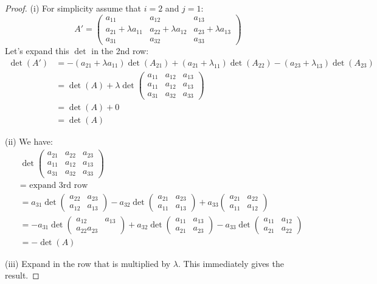 \documentclass[10pt]{scrartcl}
\begin{document}
\begin{proof}
(i) For simplicity assume that $i = 2$ and $j =1$: 
\[
  A' = \begin{pmatrix}
 a_{11} & a_{12} & a_{13}\\
 a_{21} + \lambda a_{11} & a_{22} + \lambda a_{12} & a_{23} + \lambda a_{13}\\
 a_{31} & a_{32} & a_{33} 	
 \end{pmatrix}
\]
Let's expand this $\det$ in the 2nd row: 
\begin{align*}
  \det(A') &= -(a_{21} + \lambda a_{11})\det(A_{21}) + (a_{21} + \lambda_{11})\det(A_{22}) - (a_{23} + \lambda_{13})\det(A_{23})\\
  &= \det(A) + \lambda\det\begin{pmatrix}
 a_{11} & a_{12} & a_{13}\\
 a_{11} & a_{12} & a_{13}\\
 a_{31} & a_{32} & a_{33}	
 \end{pmatrix}\\
 &= \det(A) + 0 \\
 &= \det(A)
\end{align*}

(ii) We have:
\begin{align*}
  &\det\begin{pmatrix}
 a_{21} & a_{22} & a_{23}\\
 a_{11} & a_{12} & a_{13}\\
 a_{31} & a_{32} & a_{33}	
 \end{pmatrix}\\
 &= \text{ expand 3rd row }\\
 &= a_{31}\det\begin{pmatrix}
a_{22} &a_{23}\\ a_{12} & a_{13}	
\end{pmatrix}
- a_{32}\det\begin{pmatrix}
a_{21} & a_{23}\\ a_{11} & a_{13}	
\end{pmatrix}
+ a_{33}\begin{pmatrix}
a_{21} & a_{22} \\ a_{11} & a_{12}	
\end{pmatrix}\\
&= -a_{31}\det\begin{pmatrix}
a_{12} & a_{13}\\ a_{22} a_{23}	
\end{pmatrix} + a_{32}\det\begin{pmatrix}
a_{11} & a_{13} \\ a_{21} & a_{23}	
\end{pmatrix}
- a_{33} \det\begin{pmatrix}
	a_{11} & a_{12} \\ a_{21} & a_{22}
\end{pmatrix}\\
&= -\det(A)
\end{align*}



(iii) Expand in the row that is multiplied by $\lambda$. This immediately gives the result.
\end{proof}\vsp
\end{document}
